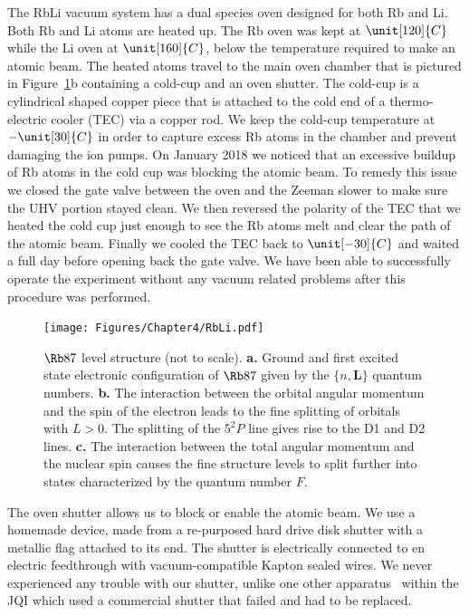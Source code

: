 The RbLi vacuum system has a dual species oven designed for both Rb and Li. Both Rb and Li atoms are heated up. The Rb oven was kept at $\unit[120]{C}$ while the Li oven at $\unit[160]{C}$, below the temperature required to make an atomic beam. The heated atoms travel to the main oven chamber that is pictured in Figure~\ref{fig:RbLi}b containing a cold-cup and an oven shutter. The cold-cup is a cylindrical shaped copper piece that is attached to the cold end of a thermo-electric cooler (TEC) via a copper rod. We keep the cold-cup temperature at $-\unit[30]{C}$ in order to capture excess Rb atoms in the chamber and prevent damaging the ion pumps. On January 2018 we noticed that an excessive buildup of Rb atoms in the cold cup was blocking the atomic beam. To remedy this issue we closed the gate valve between the oven and the Zeeman slower to make sure the UHV portion stayed clean. We then reversed the polarity of the TEC that we heated the cold cup just enough to see the Rb atoms melt and clear the path of the atomic beam. Finally we cooled the TEC back to $\unit[-30]{C}$ and waited a full day before opening back the gate valve. We have been able to successfully operate the experiment without any vacuum related problems after this procedure was performed. 

\begin{figure}[htb]
\begin{center}
\texttt{[image: Figures/Chapter4/RbLi.pdf]}
\caption[The RbLi vacuum system]{$\Rb87$ level structure (not to scale). {\bf a.} Ground and first excited state electronic configuration of $\Rb87$ given by the $\{n,\mathbf{L}\}$ quantum numbers. {\bf b.} The interaction between the orbital angular momentum and the spin of the electron leads to the fine splitting of orbitals with $L>0$. The splitting of the $5^2P$ line gives rise to the D1 and D2 lines. {\bf c.} The interaction between the total angular momentum and the nuclear spin causes the fine structure levels to split further into states characterized by the quantum number $F$.}
\label{fig:RbLi}
\end{center}
\end{figure}

The oven shutter allows us to block or enable the atomic beam. We use a homemade device, made from a re-purposed hard drive disk shutter with a metallic flag attached to its end. The shutter is electrically connected to en electric feedthrough with vacuum-compatible Kapton sealed wires. We never experienced any trouble with our shutter, unlike one other apparatus~\cite{BrownThesis} within the JQI which used a  commercial shutter that failed and had to be replaced. 


